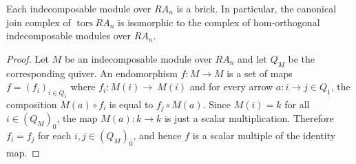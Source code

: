 \documentclass[ALCO,ThmDefs,Unicode,epreuves]{cedram}
\DeclareMathOperator{\tors}{tors}
\renewcommand{\1}{\hat{1}}
\newcommand{\0}{\hat{0}}
\begin{document}
\begin{proposition}\label{cor: RA_n schur}
Each indecomposable module over $RA_n$ is a brick.
In particular, the canonical join complex of $\tors RA_n$ is isomorphic to the complex of hom-orthogonal indecomposable modules over $RA_n$.
\end{proposition}
\begin{proof}
Let $M$ be an indecomposable module over $RA_n$ and let $Q_M$ be the corresponding quiver.
An endomorphism $f:M\rightarrow M$ is a set of maps $f=(f_i)_{i\in Q_1}$ where $f_i:M(i)\rightarrow~M(i)$ and for every arrow $a:i\rightarrow j\in Q_1$, the composition $M(a)\circ f_i$ is equal to ${f_j\circ M(a)}$. Since $M(i)=k$ for all $i\in (Q_M)_0$, the map $M(a):k\rightarrow k$ is just a scalar multiplication. Therefore $f_i=f_j$ for each $i,j\in (Q_M)_0$, and hence $f$ is a scalar multiple of the identity map.
\end{proof}


%
%
%
%
%
%
%
%
%
%
\end{document}
